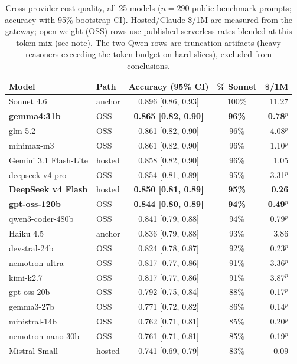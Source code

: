 \documentclass[11pt]{article}
\newcommand{\NPROV}{25}            %
\newcommand{\NPROMPTS}{290}        %
\begin{document}
\begin{table}[h]
\centering
\caption{Cross-provider cost-quality, all \NPROV{} models ($n{=}\NPROMPTS$ public-benchmark
prompts; accuracy with 95\% bootstrap CI). Hosted/Claude \$/1M are measured from the gateway;
open-weight (OSS) rows use published serverless rates blended at this token mix (see note). The
two Qwen rows are truncation artifacts (heavy reasoners exceeding the token budget on hard
slices), excluded from conclusions.}
\label{tab:prov}
\scriptsize
\begin{tabular}{@{}llccr@{}}
\toprule
Model & Path & Accuracy (95\% CI) & \% Sonnet & \$/1M \\
\midrule
Sonnet 4.6 & anchor & 0.896 [0.86, 0.93] & 100\% & 11.27 \\
\textbf{gemma4:31b} & OSS & \textbf{0.865 [0.82, 0.90]} & \textbf{96\%} & \textbf{0.78}$^{p}$ \\
glm-5.2 & OSS & 0.861 [0.82, 0.90] & 96\% & 4.08$^{p}$ \\
minimax-m3 & OSS & 0.861 [0.82, 0.90] & 96\% & 1.10$^{p}$ \\
Gemini 3.1 Flash-Lite & hosted & 0.858 [0.82, 0.90] & 96\% & 1.05 \\
deepseek-v4-pro & OSS & 0.854 [0.81, 0.89] & 95\% & 3.31$^{p}$ \\
\textbf{DeepSeek v4 Flash} & hosted & \textbf{0.850 [0.81, 0.89]} & \textbf{95\%} & \textbf{0.26} \\
\textbf{gpt-oss-120b} & OSS & \textbf{0.844 [0.80, 0.89]} & \textbf{94\%} & \textbf{0.49}$^{p}$ \\
qwen3-coder-480b & OSS & 0.841 [0.79, 0.88] & 94\% & 0.79$^{p}$ \\
Haiku 4.5 & anchor & 0.836 [0.79, 0.88] & 93\% & 3.86 \\
devstral-24b & OSS & 0.824 [0.78, 0.87] & 92\% & 0.23$^{p}$ \\
nemotron-ultra & OSS & 0.817 [0.77, 0.86] & 91\% & 3.36$^{p}$ \\
kimi-k2.7 & OSS & 0.817 [0.77, 0.86] & 91\% & 3.87$^{p}$ \\
gpt-oss-20b & OSS & 0.792 [0.75, 0.84] & 88\% & 0.17$^{p}$ \\
gemma3-27b & OSS & 0.771 [0.72, 0.82] & 86\% & 0.14$^{p}$ \\
ministral-14b & OSS & 0.762 [0.71, 0.81] & 85\% & 0.20$^{p}$ \\
nemotron-nano-30b & OSS & 0.761 [0.71, 0.81] & 85\% & 0.19$^{p}$ \\
Mistral Small & hosted & 0.741 [0.69, 0.79] & 83\% & 0.09 \\

\end{tabular}
\end{table}
\end{document}
